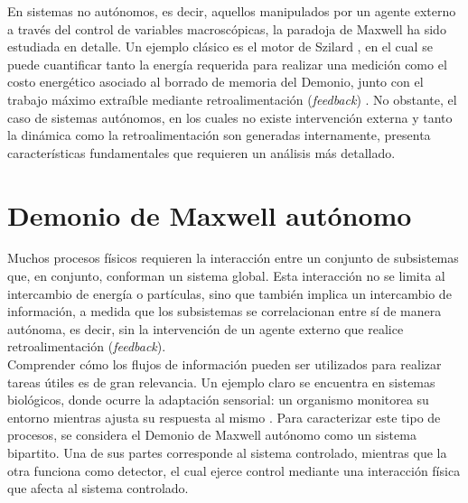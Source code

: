 En sistemas no autónomos, es decir, aquellos manipulados por un agente externo a través del control de variables macroscópicas, la paradoja de Maxwell ha sido estudiada en detalle. Un ejemplo clásico es el motor de Szilard \cite{szilard1964decrease}, en el cual se puede cuantificar tanto la energía requerida para realizar una medición como el costo energético asociado al borrado de memoria del Demonio, junto con el trabajo máximo extraíble mediante retroalimentación (\textit{feedback}) \cite{maruyama2009colloquium, sagawa2008second}. No obstante, el caso de sistemas autónomos, en los cuales no existe intervención externa y tanto la dinámica como la retroalimentación son generadas internamente, presenta características fundamentales que requieren un análisis más detallado.


\label{sec4:Demon}

\section{Demonio de Maxwell autónomo}

Muchos procesos físicos requieren la interacción entre un conjunto de subsistemas que, en conjunto, conforman un sistema global. Esta interacción no se limita al intercambio de energía o partículas, sino que también implica un intercambio de información, a medida que los subsistemas se correlacionan entre sí de manera autónoma, es decir, sin la intervención de un agente externo que realice retroalimentación (\textit{feedback}). 
\\

Comprender cómo los flujos de información pueden ser utilizados para realizar tareas útiles es de gran relevancia. Un ejemplo claro se encuentra en sistemas biológicos, donde ocurre la adaptación sensorial: un organismo monitorea su entorno mientras ajusta su respuesta al mismo \cite{lan2012energy}. Para caracterizar este tipo de procesos, se considera el Demonio de Maxwell autónomo como un sistema bipartito. Una de sus partes corresponde al sistema controlado, mientras que la otra funciona como detector, el cual ejerce control mediante una interacción física que afecta al sistema controlado. 
\\

